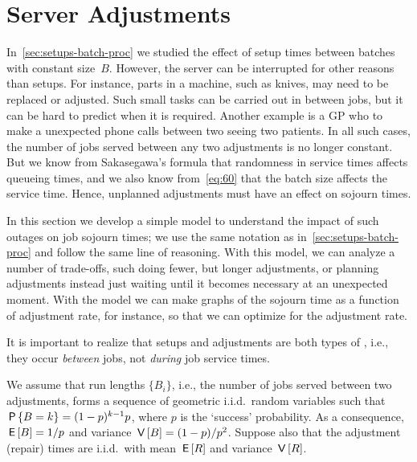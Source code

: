


\section{Server Adjustments}
\label{sec:non-preempt-interr}


In~\cref{sec:setups-batch-proc} we studied the effect of setup times between batches with constant size~$B$.
However, the server can be interrupted for other reasons than setups.
For instance, parts in a machine, such as knives, may need to be replaced or adjusted.
Such small tasks can be carried out in between jobs, but it can be hard to predict when it is required.
Another example is a GP who  to make a unexpected phone calls between two seeing two patients.
In all such cases, the number of jobs
served between any two adjustments
is no longer constant.
But we know from Sakasegawa's formula that randomness in service times affects queueing times, and we also know from~\cref{eq:60} that the batch size affects the service time.
Hence, unplanned adjustments must have an effect on sojourn times.


In this section we develop a simple model to understand the impact of such outages on job sojourn times; we use the same notation as in~\cref{sec:setups-batch-proc} and follow the same line of reasoning.
With this model, we can analyze a number of trade-offs, such doing fewer, but longer adjustments, or planning adjustments instead just waiting until it becomes necessary at an unexpected moment. With the model we can make graphs of the sojourn time as a function of adjustment rate, for instance, so that we can optimize for the adjustment rate.

It is important to realize that setups and adjustments are both types of , i.e., they occur \emph{between} jobs, not \emph{during}  job service times. 




We assume that run lengths $\{B_i\}$, i.e., the number of jobs served between two adjustments, forms a sequence of geometric i.i.d.\ random variables such that $\P{B=k} = (1-p)^{k-1}p$, where $p$ is the `success' probability.
As a consequence, $\E B=1/p$ and variance $\V B = (1-p)/p^2$. Suppose also that the adjustment (repair) times are i.i.d.\ with mean $\E R$ and variance $\V R$.

